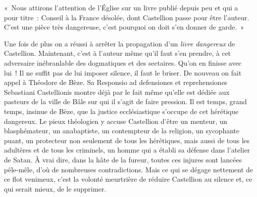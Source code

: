\documentclass[french,twoside]{book} %
\newcommand{\astermono}{\medskip\centerline{\color{rubric}\large\selectfont{\syms ✻}}\medskip\par}%
\newenvironment{quoteblock}%
  {\begin{quoting}}
  {\end{quoting}}
\newenvironment{quotebar}{%
    \def\FrameCommand{{\color{rubric!10!}\vrule width 0.5em} \hspace{0.9em}}%
    \def\OuterFrameSep{2pt} %
    \MakeFramed {\advance\hsize-\width \FrameRestore}
  }%
  {%
    \endMakeFramed
  }
\renewenvironment{quoteblock}%
  {%
    \savenotes
    \setstretch{0.9}
    \normalfont
    \begin{quotebar}
  }
  {%
    \end{quotebar}
    \spewnotes
  }
\begin{document}
\begin{quoteblock}
\noindent « Nous attirons l’attention de l’Église sur un livre publié depuis peu et qui a pour titre : Conseil à la France désolée, dont Castellion passe pour être l’auteur. C’est une pièce très dangereuse, c’est pourquoi on doit s’en donner de garde. »\end{quoteblock}

\noindent Une fois de plus on a réussi à arrêter la propagation d’un \emph{livre dangereux} de Castellion. Maintenant, c’est à l’auteur même qu’il faut s’en prendre, à cet adversaire inébranlable des dogmatiques et des sectaires. Qu’on en finisse avec lui ! Il ne suffit pas de lui imposer silence, il faut le briser. De nouveau on fait appel à Théodore de Bèze. Sa Responsio ad defensiones et reprehensiones Sebastiani Castellionis montre déjà par le fait même qu’elle est dédiée aux pasteurs de la ville de Bâle sur qui il s’agit de faire pression. Il est temps, grand temps, insinue de Bèze, que la justice ecclésiastique s’occupe de cet hérétique dangereux. Le pieux théologien y accuse Castellion d’être un menteur, un blasphémateur, un anabaptiste, un contempteur de la religion, un sycophante puant, un protecteur non seulement de tous les hérétiques, mais aussi de tous les adultères et de tous les criminels, un homme qui a établi sa défense dans l’atelier de Satan. À vrai dire, dans la hâte de la fureur, toutes ces injures sont lancées pêle-mêle, d’où de nombreuses contradictions. Mais ce qui se dégage nettement de ce flot venimeux, c’est la volonté meurtrière de réduire Castellion au silence et, ce qui serait mieux, de le supprimer.\par

\astermono
\end{document}
